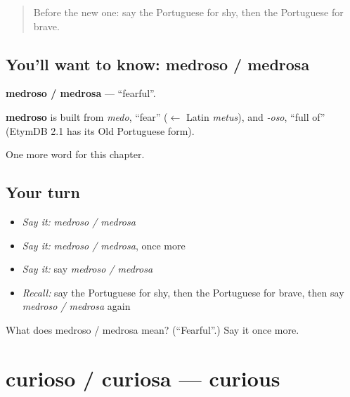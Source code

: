 \label{lesson:PT-C185-medroso-medrosa}



\begin{quote}
Before the new one: say the Portuguese for shy, then the Portuguese for brave.
\end{quote}

\subsection*{You'll want to know: medroso / medrosa}
\textbf{medroso / medrosa} — \textquotedblleft{}fearful\textquotedblright{}.

\begin{cousinweb}
\textbf{medroso} is built from \emph{medo}, \textquotedblleft{}fear\textquotedblright{} ($\leftarrow$ Latin \emph{metus}), and \emph{-oso}, \textquotedblleft{}full of\textquotedblright{} (EtymDB 2.1 has its Old Portuguese form).
\end{cousinweb}

\begin{grammarlens}[title={What you've built}]
One more word for this chapter.
\end{grammarlens}

\subsection*{Your turn}
\begin{itemize}
\raggedright
  \item \emph{Say it:} \emph{medroso / medrosa}
  \item \emph{Say it:} \emph{medroso / medrosa}, once more
  \item \emph{Say it:} say \emph{medroso / medrosa}
  \item \emph{Recall:} say the Portuguese for shy, then the Portuguese for brave, then say \emph{medroso / medrosa} again
\end{itemize}

\begin{tcolorbox}[breakable,colback=teal!4,colframe=teal!35!black,title={Before you move on}]
What does medroso / medrosa mean? (\textquotedblleft{}Fearful\textquotedblright{}.) Say it once more.
\end{tcolorbox}
\section[curioso / curiosa]{curioso / curiosa — curious}

